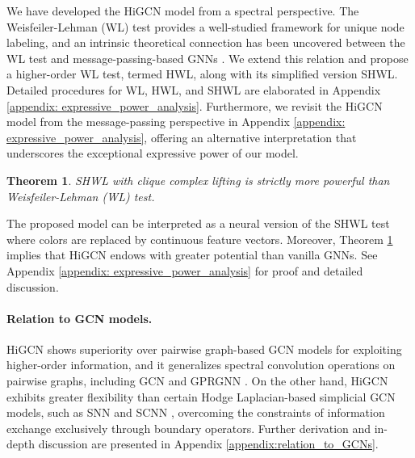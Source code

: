 \documentclass[letterpaper]{article} \usepackage{aaai24}
\theoremstyle{plain}
\newtheorem{theorem}{Theorem}[section]
\theoremstyle{definition}
\theoremstyle{remark}
\begin{document}
We have developed the HiGCN model from a spectral perspective. 
The Weisfeiler-Lehman (WL) test \cite{WLtest} provides a well-studied framework for unique node labeling, and an intrinsic theoretical connection has been uncovered between the WL test and message-passing-based GNNs \cite{GIN2019, kWL2019}. 
We extend this relation and propose a higher-order WL test, termed HWL, along with its simplified version SHWL. 
Detailed procedures for WL, HWL, and SHWL are elaborated in Appendix \ref{appendix: expressive_power_analysis}.
Furthermore, we revisit the HiGCN model from the message-passing perspective in Appendix  \ref{appendix: expressive_power_analysis}, offering an alternative interpretation that underscores the exceptional expressive power of our model.









\begin{theorem}
\label{the:SHWL}
SHWL with clique complex lifting is strictly more powerful than Weisfeiler-Lehman (WL) test.
\end{theorem}







The proposed model can be interpreted as a neural version of the SHWL test where colors are replaced by continuous feature vectors.
Moreover, Theorem \ref{the:SHWL} implies that HiGCN endows with greater potential than vanilla GNNs. See Appendix \ref{appendix: expressive_power_analysis} for proof and detailed discussion.



\paragraph{Relation to GCN models.}


HiGCN shows superiority over pairwise graph-based GCN models for exploiting higher-order information, and it generalizes spectral convolution operations on pairwise graphs, including GCN \cite{GCN} and GPRGNN \cite{GPRGNN}.
On the other hand, HiGCN exhibits greater flexibility than certain Hodge Laplacian-based simplicial GCN models, such as SNN \cite{SNN2020} and SCNN \cite{SCNN2022}, overcoming the constraints of information exchange exclusively through boundary operators.
Further derivation and in-depth discussion are presented in Appendix \ref{appendix:relation_to_GCNs}.
\end{document}

